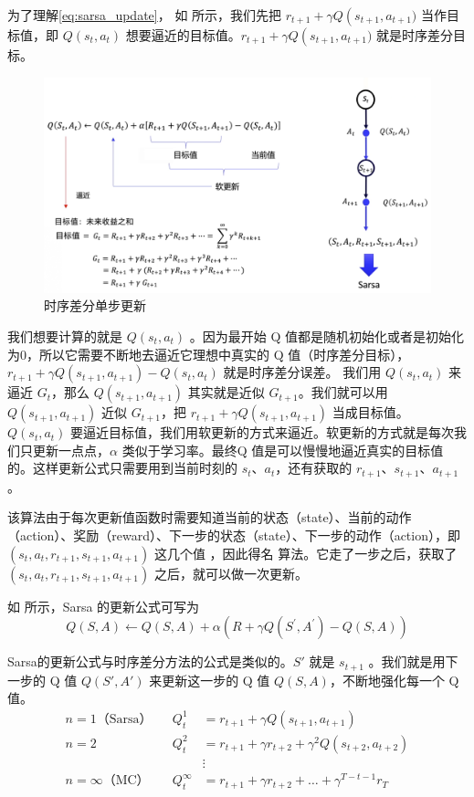 为了理解\eqref{eq:sarsa_update}，
如 所示，我们先把 $r_{t+1}+\gamma Q\left(s_{t+1}, a_{t+1}\right.)$ 当作目标值，即 $Q(s_t,a_t)$ 想要逼近的目标值。$r_{t+1}+\gamma Q\left(s_{t+1}, a_{t+1}\right.)$ 就是时序差分目标。

\begin{figure}[htb]
	\centering
	\includegraphics[width=0.5\linewidth]{res/ch3/3.14}
	\caption{时序差分单步更新}
	\label{fig:fig3.14}
\end{figure}

我们想要计算的就是 $Q(s_t,a_t)$ 。因为最开始 Q 值都是随机初始化或者是初始化为0，所以它需要不断地去逼近它理想中真实的 Q 值（时序差分目标），$r_{t+1}+\gamma Q\left(s_{t+1}, a_{t+1}\right)-Q\left(s_{t}, a_{t}\right)$ 就是时序差分误差。
我们用 $Q(s_t,a_t)$ 来逼近 $G_t$，那么 $Q(s_{t+1},a_{t+1})$ 其实就是近似 $G_{t+1}$。我们就可以用  $Q(s_{t+1},a_{t+1})$ 近似 $G_{t+1}$，把  $r_{t+1}+\gamma Q(s_{t+1},a_{t+1})$  当成目标值。
$Q(s_t,a_t)$  要逼近目标值，我们用软更新的方式来逼近。软更新的方式就是每次我们只更新一点点，$\alpha$ 类似于学习率。最终Q 值是可以慢慢地逼近真实的目标值的。这样更新公式只需要用到当前时刻的 $s_{t}$、$a_t$，还有获取的 $r_{t+1}$、$s_{t+1}$、$a_{t+1}$ 。

该算法由于每次更新值函数时需要知道当前的状态（state）、当前的动作（action）、奖励（reward）、下一步的状态（state）、下一步的动作（action），即 $(s_{t}, a_{t}, r_{t+1}, s_{t+1}, a_{t+1})$ 这几个值 ，因此得名  算法。它走了一步之后，获取了 $(s_{t}, a_{t}, r_{t+1}, s_{t+1}, a_{t+1})$  之后，就可以做一次更新。

如 所示，Sarsa 的更新公式可写为
\begin{equation}
	\label{eq:}
	Q(S, A) \leftarrow Q(S, A)+\alpha\left(R+\gamma Q\left(S^{\prime}, A^{\prime}\right)-Q(S, A)\right)
\end{equation}

Sarsa的更新公式与时序差分方法的公式是类似的。$S'$ 就是 $s_{t+1}$ 。我们就是用下一步的 Q 值 $Q(S',A')$ 来更新这一步的 Q 值 $Q(S,A)$，不断地强化每一个 Q 值。
\begin{equation}
	\label{eq:n-step_sarsa}
	\begin{array}{lrl}
		{n=1}\text {（Sarsa）} &Q_{t}^{1}&=r_{t+1}+\gamma Q\left(s_{t+1}, a_{t+1}\right) \\
		n=2 &Q_{t}^{2}&=r_{t+1}+\gamma r_{t+2}+\gamma^{2} Q\left(s_{t+2}, a_{t+2}\right) \\
		&&\vdots \\
		n=\infty\text{（MC）} \quad &Q_{t}^{\infty}&=r_{t+1}+\gamma r_{t+2}+\ldots+\gamma^{T-t-1} r_{T}
		\end{array}
\end{equation}

